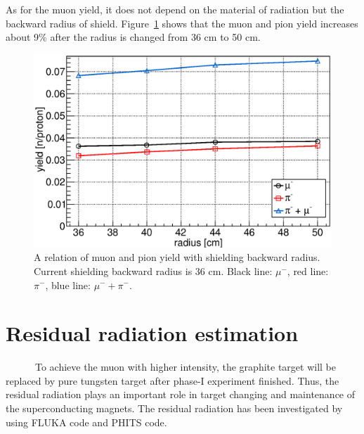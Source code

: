 As for the muon yield, it does not depend on the material of radiation but the backward radius of shield.
Figure~\ref{radius} shows that the muon and pion yield increases about 9\% after the radius is changed from 36 cm to 50 cm.
\begin{figure}[H]
 \centering
 \includegraphics[scale=0.43]{chapter3/fig/muon.eps}
 \caption{A relation of muon and pion yield with shielding backward radius. Current shielding backward radius is 36 cm. Black line: $\mu^-$, red line: $\pi^-$, blue line: $\mu^- + \pi^-$.}
 \label{radius}
\end{figure}

 \section{Residual radiation estimation}
~~~~~~To achieve the muon with higher intensity, the graphite target will be replaced by pure tungsten target after phase-I experiment finished.
Thus, the residual radiation plays an important role in target changing and maintenance of the superconducting magnets.
The residual radiation has been investigated by using FLUKA code and PHITS code.

